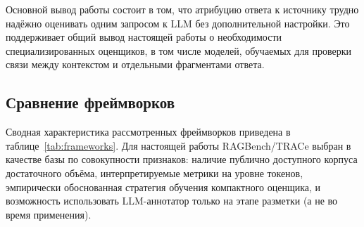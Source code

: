 Основной вывод работы состоит в том, что атрибуцию ответа к источнику трудно 
надёжно оценивать одним запросом к LLM без дополнительной настройки. Это 
поддерживает общий вывод настоящей работы о необходимости специализированных 
оценщиков, в том числе моделей, обучаемых для проверки связи между контекстом 
и отдельными фрагментами ответа.

\subsection{Сравнение фреймворков}

Сводная характеристика рассмотренных фреймворков приведена в таблице~\ref{tab:frameworks}. 
Для настоящей работы RAGBench/TRACe выбран в качестве базы по совокупности признаков: 
наличие публично доступного корпуса достаточного объёма, интерпретируемые метрики на уровне 
токенов, эмпирически обоснованная стратегия обучения компактного оценщика, и возможность 
использовать LLM-аннотатор только на этапе разметки (а не во время применения).

